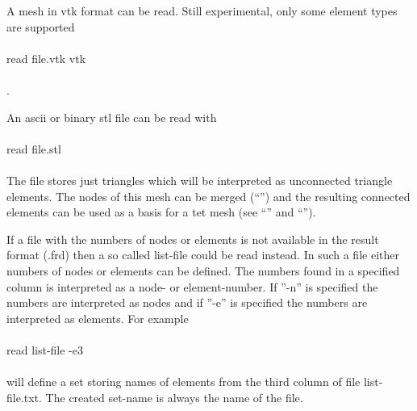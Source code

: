 \documentclass{article}
\begin{document}
A mesh in vtk format can be read. Still experimental, only some element types are supported\\\\read file.vtk vtk\\\\.

An ascii or binary stl file can be read with \\\\read file.stl\\\\ The file stores just triangles which will be interpreted as unconnected triangle elements. The nodes of this mesh can be merged (``'') and the resulting connected elements can be used as a basis for a tet mesh (see ``'' and ``'').

If a file with the numbers of nodes or elements is not available in the result format (.frd) then a so called list-file could be read instead. In such a file either numbers of nodes or elements can be defined. The numbers found in a specified column is interpreted as a node- or element-number. If ''-n'' is specified the numbers are interpreted as nodes and if ''-e'' is specified the numbers are interpreted as elements. For example\\\\read list-file -e3\\\\will define a set storing names of elements from the third column of file list-file.txt. The created set-name is always the name of the file.\\\\
\end{document}

